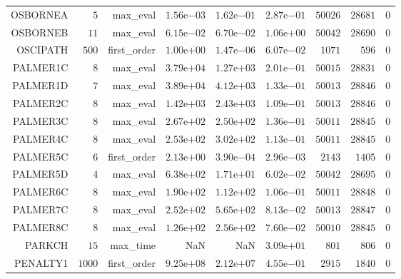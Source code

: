 \begin{longtable}{rrrrrrrrr}
OSBORNEA & \(     5\) & max\_eval & \( 1.56\)e\(-03\) & \( 1.62\)e\(-01\) & \( 2.87\)e\(-01\) & \( 50026\) & \( 28681\) & \(     0\) \\
OSBORNEB & \(    11\) & max\_eval & \( 6.15\)e\(-02\) & \( 6.70\)e\(-02\) & \( 1.06\)e\(+00\) & \( 50042\) & \( 28690\) & \(     0\) \\
OSCIPATH & \(   500\) & first\_order & \( 1.00\)e\(+00\) & \( 1.47\)e\(-06\) & \( 6.07\)e\(-02\) & \(  1071\) & \(   596\) & \(     0\) \\
PALMER1C & \(     8\) & max\_eval & \( 3.79\)e\(+04\) & \( 1.27\)e\(+03\) & \( 2.01\)e\(-01\) & \( 50015\) & \( 28831\) & \(     0\) \\
PALMER1D & \(     7\) & max\_eval & \( 3.89\)e\(+04\) & \( 4.12\)e\(+03\) & \( 1.33\)e\(-01\) & \( 50013\) & \( 28846\) & \(     0\) \\
PALMER2C & \(     8\) & max\_eval & \( 1.42\)e\(+03\) & \( 2.43\)e\(+03\) & \( 1.09\)e\(-01\) & \( 50013\) & \( 28846\) & \(     0\) \\
PALMER3C & \(     8\) & max\_eval & \( 2.67\)e\(+02\) & \( 2.50\)e\(+02\) & \( 1.36\)e\(-01\) & \( 50011\) & \( 28845\) & \(     0\) \\
PALMER4C & \(     8\) & max\_eval & \( 2.53\)e\(+02\) & \( 3.02\)e\(+02\) & \( 1.13\)e\(-01\) & \( 50011\) & \( 28845\) & \(     0\) \\
PALMER5C & \(     6\) & first\_order & \( 2.13\)e\(+00\) & \( 3.90\)e\(-04\) & \( 2.96\)e\(-03\) & \(  2143\) & \(  1405\) & \(     0\) \\
PALMER5D & \(     4\) & max\_eval & \( 6.38\)e\(+02\) & \( 1.71\)e\(+01\) & \( 6.02\)e\(-02\) & \( 50042\) & \( 28695\) & \(     0\) \\
PALMER6C & \(     8\) & max\_eval & \( 1.90\)e\(+02\) & \( 1.12\)e\(+02\) & \( 1.06\)e\(-01\) & \( 50011\) & \( 28848\) & \(     0\) \\
PALMER7C & \(     8\) & max\_eval & \( 2.52\)e\(+02\) & \( 5.65\)e\(+02\) & \( 8.13\)e\(-02\) & \( 50013\) & \( 28847\) & \(     0\) \\
PALMER8C & \(     8\) & max\_eval & \( 1.26\)e\(+02\) & \( 2.56\)e\(+02\) & \( 7.60\)e\(-02\) & \( 50010\) & \( 28845\) & \(     0\) \\
PARKCH & \(    15\) & max\_time &       NaN &       NaN & \( 3.09\)e\(+01\) & \(   801\) & \(   806\) & \(     0\) \\
PENALTY1 & \(  1000\) & first\_order & \( 9.25\)e\(+08\) & \( 2.12\)e\(+07\) & \( 4.55\)e\(-01\) & \(  2915\) & \(  1840\) & \(     0\) \\

\end{longtable}
